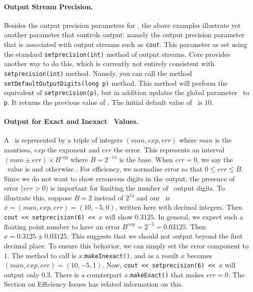 \documentclass[12pt]{article}
\begin{document}

\paragraph{Output Stream Precision.}
Besides the output precision parameters for \BF,
the above examples illustrate yet another parameter
that controls output: namely the output precision parameter
that is associated with output streams such as \texttt{cout}.
This parameter as set using the standard \texttt{setprecision(int)} method
of output streams.   Core provides another way to do this,
which is currently not entirely 
consistent with \texttt{setprecision(int)} method.
%
%
Namely, you can call the method
\texttt{setDefaultOutputDigits(long p)} method.  This method
will perform the equivalent of \texttt{setprecision(p)}, but in addition
updates the global parameter \ to \texttt{p}.
It returns the previous value of .
The initial default value of \ is $10$.

\paragraph{Output for Exact and Inexact \BF\ Values.} 
A \BF\ is represented by a triple of integers
$(man, exp, err)$ where $man$ is the mantissa,
$exp$ the exponent and $err$ the error.  This represents
an interval $(man \pm err)\times B^{exp}$ where
$B=2^{-14}$ is the base.  When $err=0$, we say the
\BF\ value is  and otherwise .
For efficiency, we normalize error so that $0\le err\le B$.
Since we do not want to show erroneous digits in the
output, the presence of error ($err>0$) is important
for limiting the number of \BF\ output digits.
To illustrate this, suppose $B=2$ instead of $2^{14}$
and our \BF\ is $x = (man, exp, err)=(10, -5, 0)$,
written here with decimal integers.
Then \texttt{cout << setprecision(6) << $x$} will
show $0.3125$.  In general, we expect such a floating
point number to have an error $B^{exp}=2^{-5}=0.03125$.
Then $x = 0.3125 \pm 0.03125$.  This suggests that
we should not output beyond the first decimal place.
To ensure this behavior, we can simply set the
error component to $1$.  The method to call is
$x$.{\tt makeInexact()}, and as a result
$x$ becomes $(man, exp, err)=(10, -5, 1)$.  Now, 
\texttt{cout << setprecision(6) << $x$} will output
only $0.3$.  There is a counterpart $x$.{\tt makeExact()}
that makes $err=0$.  The Section on Efficiency Issues has
related information on this.
\end{document}
